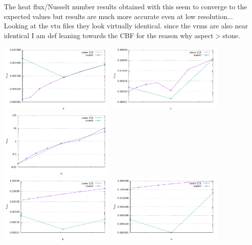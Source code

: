 The heat flux/Nusselt number results obtained with this \stone seem to converge 
to the expected values but \aspect results are much more accurate even at low
resolution... 
Looking at the vtu files they look virtually identical. since the vrms are also 
near identical I am def leaning towards the CBF for the reason why aspect$>$stone.

\begin{center}
\includegraphics[width=5.7cm]{python_codes/fieldstone_110/results_BA/slopes/vrms_1e4_conv}
\includegraphics[width=5.7cm]{python_codes/fieldstone_110/results_BA/slopes/vrms_1e5_conv}
\includegraphics[width=5.7cm]{python_codes/fieldstone_110/results_BA/slopes/vrms_1e6_conv}\\
\includegraphics[width=5.7cm]{python_codes/fieldstone_110/results_BA/slopes/q_1e4_conv}
\includegraphics[width=5.7cm]{python_codes/fieldstone_110/results_BA/slopes/q_1e5_conv}

\end{center}
